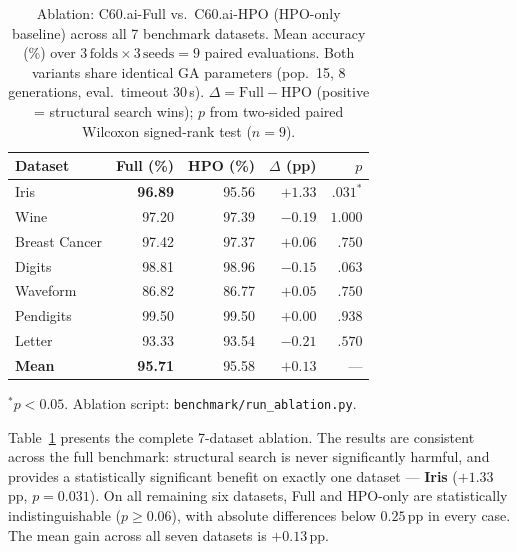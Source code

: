 \documentclass{article}
\theoremstyle{definition}
\theoremstyle{plain}
\theoremstyle{remark}
\begin{document}
\begin{table}[t]
  \caption{%
    Ablation: C60.ai-Full vs.\ C60.ai-HPO (HPO-only baseline) across all
    7 benchmark datasets.
    Mean accuracy (\%) over $3\,\text{folds} \times 3\,\text{seeds} = 9$
    paired evaluations.
    Both variants share identical GA parameters (pop.\ 15, 8 generations,
    eval.\ timeout 30\,s).
    $\Delta = \text{Full} - \text{HPO}$ (positive = structural search wins);
    $p$ from two-sided paired Wilcoxon signed-rank test ($n{=}9$).%
  }
  \label{tab:ablation}
  \vskip 0.05in
  \begin{center}
    \begin{small}
      \begin{tabular}{lrrrr}
        \toprule
        Dataset       & Full (\%)        & HPO (\%)  & $\Delta$ (pp) & $p$ \\
        \midrule
        Iris          & \textbf{96.89}   & 95.56     & $+1.33$       & $.031^{*}$ \\
        Wine          & 97.20            & 97.39     & $-0.19$       & $1.000$    \\
        Breast Cancer & 97.42            & 97.37     & $+0.06$       & $.750$     \\
        Digits        & 98.81            & 98.96     & $-0.15$       & $.063$     \\
        Waveform      & 86.82            & 86.77     & $+0.05$       & $.750$     \\
        Pendigits     & 99.50            & 99.50     & $+0.00$       & $.938$     \\
        Letter        & 93.33            & 93.54     & $-0.21$       & $.570$     \\
        \midrule
        \textbf{Mean} & \textbf{95.71}   & 95.58     & $+0.13$       & ---        \\
        \bottomrule
      \end{tabular}
    \end{small}
  \end{center}
  \begin{flushleft}
    \footnotesize $^{*}p < 0.05$.
    Ablation script: \texttt{benchmark/run\_ablation.py}.
  \end{flushleft}
  \vskip -0.1in
\end{table}

Table~\ref{tab:ablation} presents the complete 7-dataset ablation.
The results are consistent across the full benchmark: structural search
is never significantly harmful, and provides a statistically significant
benefit on exactly one dataset — \textbf{Iris} ($+1.33$\,pp, $p{=}0.031$).
On all remaining six datasets, Full and HPO-only are statistically
indistinguishable ($p \geq 0.06$), with absolute differences below
$0.25$\,pp in every case.
The mean gain across all seven datasets is $+0.13$\,pp.
\end{document}
